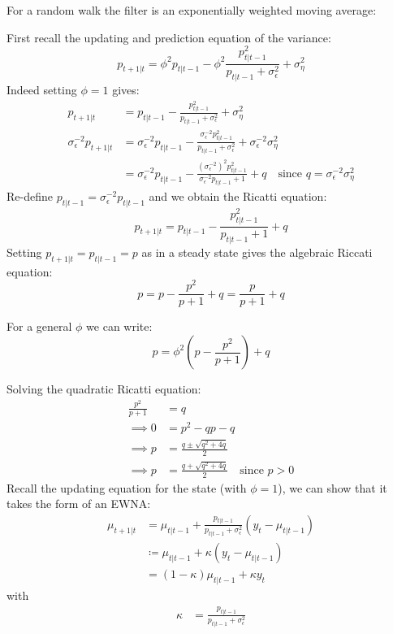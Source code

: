 \documentclass[DIV=14,titlepage=false]{scrreprt}
\begin{document}
For a random walk the filter is an exponentially weighted moving average:
\begin{example}[$\phi = 1$]
    First recall the updating and prediction equation of the variance:
\[
    p_{t+1|t} = \phi^2 p_{t|t-1}-\phi^2 \frac{p_{t|t-1}^2}{p_{t|t-1} + \sigma^2_\epsilon} + \sigma^2_\eta
\]
Indeed setting $\phi = 1$ gives:
\begin{align*}
    p_{t+1|t} &= p_{t|t-1} - \frac{p_{t|t-1}^2}{p_{t|t-1} + \sigma^2_\epsilon} + \sigma^2_\eta\\
    \sigma^{-2}_\epsilon p_{t+1|t} &= \sigma^{-2}_\epsilon p_{t|t-1} - \frac{\sigma^{-2}_\epsilon p_{t|t-1}^2}{p_{t|t-1} + \sigma^2_\epsilon} + \sigma^{-2}_\epsilon \sigma^2_\eta\\
    &= \sigma^{-2}_\epsilon p_{t|t-1} - \frac{(\sigma^{-2}_\epsilon)^2 p_{t|t-1}^2}{\sigma^{-2}_\epsilon p_{t|t-1} + 1} + q \quad \text{since $q = \sigma^{-2}_\epsilon \sigma^2_\eta$}
\end{align*}
Re-define $p_{t|t-1} = \sigma^{-2}_\epsilon p_{t|t-1}$ and we obtain the Ricatti equation:
\[
    p_{t+1|t} = p_{t|t-1} - \frac{p_{t|t-1}^2}{p_{t|t-1} + 1} + q
\]
Setting $p_{t+1|t} = p_{t|t-1} =p$ as in a steady state gives the algebraic Riccati equation:
\[
    p = p - \frac{p^2}{p+1} + q  = \frac{p}{p+1} + q
\]
\begin{note}
For a general $\phi$ we can write:
\[
    p = \phi^2 \left( p - \frac{p^2}{p+1} \right) + q
\]
\end{note}
Solving the quadratic Ricatti equation:
\begin{align*}
    \frac{p^2}{p+1} &= q\\
    \implies 0 &= p^2 - qp - q\\
    \implies p &= \frac{q \pm \sqrt{q^2 + 4q}}{2}\\
    \implies p &= \frac{q + \sqrt{q^2 + 4q}}{2} \quad \text{since $p>0$}
\end{align*}
Recall the updating equation for the state (with $\phi = 1$), we can show that it takes the form of an EWNA:
\begin{align*}
    \mu_{t+1|t} &= \mu_{t|t-1} + \frac{p_{t|t-1}}{p_{t|t-1} + \sigma^2_\epsilon} (y_t - \mu_{t|t-1})\\
    &\coloneq \mu_{t|t-1} + \kappa (y_t-\mu_{t|t-1}) \\
    &= (1-\kappa) \mu_{t|t-1} + \kappa y_t
\end{align*}
with
\begin{align*}
    \kappa &= \frac{p_{t|t-1}}{p_{t|t-1} + \sigma^2_\epsilon}\\

\end{align*}
\end{example}
\end{document}
